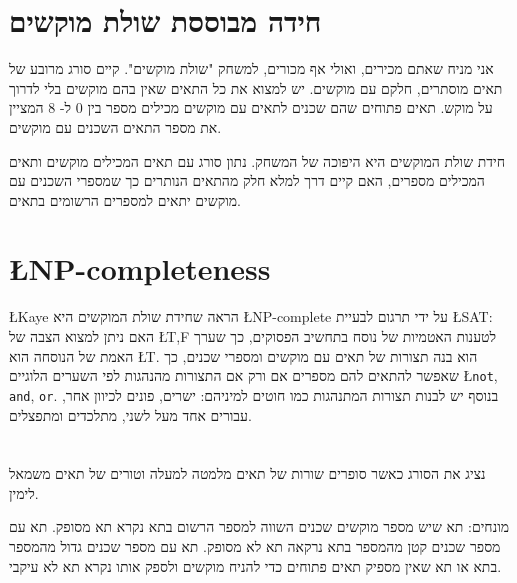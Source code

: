 \documentclass[12pt,a4paper]{article}
\begin{document}

\section{%
חידה מבוססת שולת מוקשים%
}
אני מניח שאתם מכירים, ואולי אף מכורים, למשחק "שולת מוקשים". קיים סורג מרובע של תאים מוסתרים, חלקם עם מוקשים. יש למצוא את כל התאים שאין בהם מוקשים בלי לדרוך על מוקש. תאים פתוחים שהם שכנים לתאים עם מוקשים מכילים מספר בין 
$0$
ל-%
$8$
המציין את מספר התאים השכנים עם מוקשים.

חידת שולת המוקשים היא היפוכה של המשחק. נתון סורג עם תאים המכילים מוקשים ותאים המכילים מספרים, האם קיים דרך למלא חלק מהתאים הנותרים כך שמספרי השכנים עם מוקשים יתאים למספרים הרשומים בתאים.

\section{\L{NP-completeness}}

\L{Kaye}
הראה שחידת שולת המוקשים היא
\L{NP-complete}
על ידי תרגום לבעיית
\L{SAT}:
האם ניתן למצוא הצבה של
\L{T,F}
%
לטענות האטמיות של נוסח בתחשיב הפסוקים, כך שערך האמת של הנוסחה הוא
\L{T}.
הוא בנה תצורות של תאים עם מוקשים ומספרי שכנים, כך שאפשר להתאים להם מספרים אם ורק אם התצורות מהנהגות לפי השערים הלוגיים
\L{\texttt{not}, \texttt{and}, \texttt{or}}.
בנוסף יש לבנות תצורות המתנהגות כמו חוטים למיניהם: ישרים, פונים לכיוון אחר, עבורים אחד מעל לשני, מתלכדים ומתפצלים. 

\section{}

נציג את הסורג כאשר סופרים שורות של תאים מלמטה למעלה וטורים של תאים משמאל לימין.

מונחים: תא שיש מספר מוקשים שכנים השווה למספר הרשום בתא נקרא תא מסופק. תא עם מספר שכנים קטן מהמספר בתא נרקאה תא לא מסופק. תא עם מספר שכנים גדול מהמספר בתא או תא שאין מספיק תאים פתוחים כדי להניח מוקשים ולספק אותו נקרא תא לא עיקבי.
\end{document}
